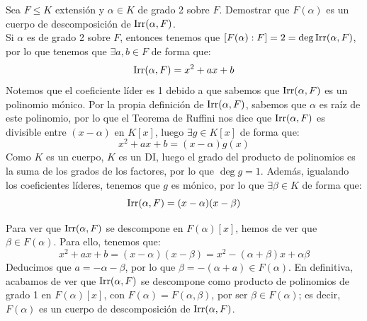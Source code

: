 \begin{ejercicio}
    Sea $F\leq K$ extensión y $\alpha\in K$ de grado 2 sobre $F$. Demostrar que $F(\alpha)$ es un cuerpo de descomposición de $\operatorname{Irr}(\alpha,F)$.\\

    \noindent
    Si $\alpha$ es de grado 2 sobre $F$, entonces tenemos que $[F(\alpha):F] = 2 = \deg\operatorname{Irr}(\alpha,F)$, por lo que tenemos que $\exists a,b\in F$ de forma que:
    \begin{equation*}
        \operatorname{Irr}(\alpha,F) = x^2+ax+b
    \end{equation*}
    Notemos que el coeficiente líder es 1 debido a que sabemos que $\operatorname{Irr}(\alpha,F)$ es un polinomio mónico. Por la propia definición de $\operatorname{Irr}(\alpha,F)$, sabemos que $\alpha$ es raíz de este polinomio, por lo que el Teorema de Ruffini nos dice que $\operatorname{Irr}(\alpha,F)$ es divisible entre $(x-\alpha)$ en $K[x]$, luego $\exists g\in K[x]$ de forma que:
    \begin{equation*}
        x^2+ax+b = (x-\alpha)g(x)
    \end{equation*}
    Como $K$ es un cuerpo, $K$ es un DI, luego el grado del producto de polinomios es la suma de los grados de los factores, por lo que $\deg g = 1$. Además, igualando los coeficientes líderes, tenemos que $g$ es mónico, por lo que $\exists \beta\in K$ de forma que:
    \begin{equation*}
        \operatorname{Irr}(\alpha,F) = (x-\alpha)(x-\beta)
    \end{equation*}

    Para ver que $\operatorname{Irr}(\alpha,F)$ se descompone en $F(\alpha)[x]$, hemos de ver que $\beta\in F(\alpha)$. Para ello, tenemos que:
    \begin{equation*}
        x^2+ax+b = (x-\alpha)(x-\beta) = x^2-(\alpha+\beta)x + \alpha\beta
    \end{equation*}
    Deducimos que $a=-\alpha-\beta$, por lo que $\beta=-(\alpha+a)\in F(\alpha)$. En definitiva, acabamos de ver que $\operatorname{Irr}(\alpha,F)$ se descompone como producto de polinomios de grado 1 en $F(\alpha)[x]$, con $F(\alpha) = F(\alpha,\beta)$, por ser $\beta\in F(\alpha)$; es decir, $F(\alpha)$ es un cuerpo de descomposición de $\operatorname{Irr}(\alpha,F)$.
\end{ejercicio}

